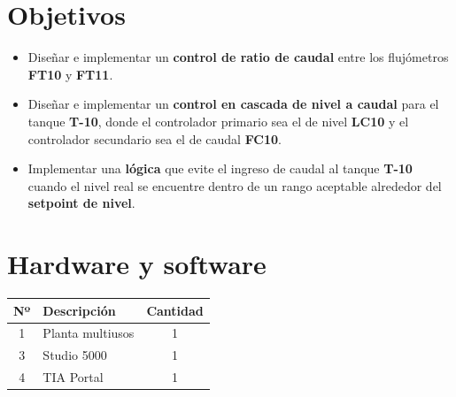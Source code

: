 \section{Objetivos}
\begin{itemize}[leftmargin=1.5em]
    \item Diseñar e implementar un \textbf{control de ratio de caudal} entre los flujómetros \textbf{FT10} y \textbf{FT11}.

     \item Diseñar e implementar un \textbf{control en cascada de nivel a caudal} para el tanque \textbf{T-10}, donde el controlador primario sea el de nivel \textbf{LC10} y el controlador secundario sea el de caudal \textbf{FC10}.

    \item Implementar una \textbf{lógica} que evite el ingreso de caudal al tanque \textbf{T-10} cuando el nivel real se encuentre dentro de un rango aceptable alrededor del \textbf{setpoint de nivel}.
\end{itemize}

\section{Hardware y software}
\begin{center}
\renewcommand{\arraystretch}{1.2}
\begin{tabular}{|c|p{}|c|}
\hline
\textbf{Nº} & \textbf{Descripción} & \textbf{Cantidad} \\\hline
1 & Planta multiusos & 1 \\\hline
3 & Studio 5000 & 1 \\\hline
4 & TIA Portal & 1 \\\hline
\end{tabular}
\end{center}
